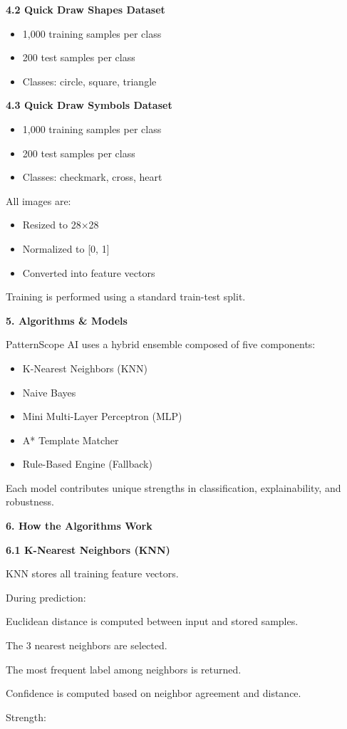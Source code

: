 \documentclass[9pt,a4paper]{extarticle}
\newcommand{\Sec}[1]{\vspace{2pt}\noindent\textbf{#1}\par\vspace{2pt}}
\newcommand{\Sub}[1]{\vspace{2pt}\noindent\textbf{#1}\par\vspace{1pt}}
\begin{document}
\Sub{4.2 Quick Draw Shapes Dataset}
\begin{itemize}
\item 1,000 training samples per class
\item 200 test samples per class
\item Classes: circle, square, triangle
\end{itemize}

\Sub{4.3 Quick Draw Symbols Dataset}
\begin{itemize}
\item 1,000 training samples per class
\item 200 test samples per class
\item Classes: checkmark, cross, heart
\end{itemize}
\newpage

All images are:
\begin{itemize}
\item Resized to 28×28
\item Normalized to [0, 1]
\item Converted into feature vectors
\end{itemize}
Training is performed using a standard train-test split.

\Sec{5. Algorithms \& Models}
PatternScope AI uses a hybrid ensemble composed of five components:
\begin{itemize}
\item K-Nearest Neighbors (KNN)
\item Naive Bayes
\item Mini Multi-Layer Perceptron (MLP)
\item A* Template Matcher
\item Rule-Based Engine (Fallback)
\end{itemize}
Each model contributes unique strengths in classification, explainability, and robustness.

\Sec{6. How the Algorithms Work}
\Sub{6.1 K-Nearest Neighbors (KNN)}
KNN stores all training feature vectors.

During prediction:

Euclidean distance is computed between input and stored samples.

The 3 nearest neighbors are selected.

The most frequent label among neighbors is returned.

Confidence is computed based on neighbor agreement and distance.

Strength:
\end{document}
